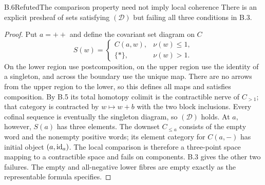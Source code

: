 \begin{claim}{B.6}{Refuted}{The comparison property need not imply local coherence}
\label{B:DnotLOC}
There is an explicit presheaf of sets satisfying $(\mathcal D)$
but failing all three conditions in B.3.
\end{claim}
\begin{proof}
Put $a=++$ and define the covariant set diagram on $C$
\[
 S(w)=
 \begin{cases}C(a,w),&\nu(w)\leq1,\\ \{*\},&\nu(w)>1.
 \end{cases}
\]
On the lower region use postcomposition, on the upper region use
the identity of a singleton, and across the boundary use the
unique map. There are no arrows from the upper region to the
lower, so this defines all maps and satisfies composition.
By B.5 its total homotopy colimit is the contractible nerve of
$C_{>1}$; that category is contracted by $w\mapsto w+b$ with
the two block inclusions. Every cofinal sequence is eventually
the singleton diagram, so $(\mathcal D)$ holds. At $a$, however,
$S(a)$ has three elements. The downset $C_{\leq a}$ consists
of the empty word and the nonempty positive words; its element
category for $C(a,-)$ has initial object $(a,\mathrm{id}_a)$.
The local comparison is therefore a three-point space mapping
to a contractible space and fails on components. B.3 gives the
other two failures. The empty and all-negative lower fibres
are empty exactly as the representable formula specifies.
\end{proof}


